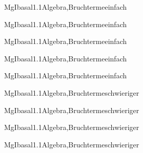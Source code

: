 \documentclass[12pt]{article}
\begin{document}
\begin{Add}{MgI}{basal1.1}{Algebra,Bruchterme}{einfach}
\end{Add}

\begin{Add}{MgI}{basal1.1}{Algebra,Bruchterme}{einfach}
\end{Add}

\begin{Add}{MgI}{basal1.1}{Algebra,Bruchterme}{einfach}
\end{Add}

\begin{Add}{MgI}{basal1.1}{Algebra,Bruchterme}{einfach}
\end{Add}
\begin{Add}{MgI}{basal1.1}{Algebra,Bruchterme}{einfach}
\end{Add}

\begin{Add}{MgI}{basal1.1}{Algebra,Bruchterme}{schwieriger}
\end{Add}

\begin{Add}{MgI}{basal1.1}{Algebra,Bruchterme}{schwieriger}
\end{Add}

\begin{Add}{MgI}{basal1.1}{Algebra,Bruchterme}{schwieriger}
\end{Add}

\begin{Add}{MgI}{basal1.1}{Algebra,Bruchterme}{schwieriger}
\end{Add}
\end{document}
